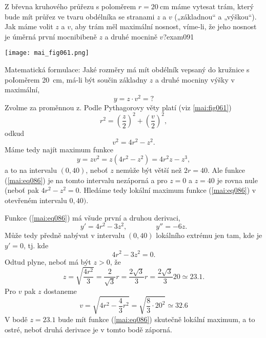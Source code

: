 \begin{mathexam}{Z břevna kruhového průřezu s poloměrem \(r = \SI{20}{\cm}\) máme vytesat trám,
  který bude mít průřez ve tvaru obdélníka se stranami \(z\) a \(v\) („základnou“ a „výškou“). Jak
  máme volit \(z\) a \(v\), aby trám měl maximální nosnost, víme-li, že jeho nosnost je úměrná první
  mocnibibeně \(z\) a druhé mocnině \(v\)?}{exam091}
   
  {\centering
    \captionsetup{type=figure}
    \texttt{[image: mai\_fig061.png]} 
    \label{mai:fig061}
  \par}
  
  Matematická formulace: Jaké rozměry má mít obdélník vepsaný do kružnice s poIoměrem \SI{20}{\cm},
  má-li být součin základny \(z\) a druhé mocniny výšky v maximální,
  \begin{equation*}
    y = z\cdot v^2 = ?
  \end{equation*}
  Zvolme za proměnnou z. Podle Pythagorovy věty platí (viz \ref{mai:fig061})
  \begin{equation*}
      r^2 = \left(\dfrac{z}{2}\right)^2 + \left(\dfrac{v}{2}\right)^2,
  \end{equation*}
  odkud 
  \begin{equation*}
      v^2 = 4r^2 - z^2.
  \end{equation*}
  Máme tedy najít maximum funkce
  \begin{equation}\label{mai:eq086}
      y = zv^2 = z(4r^2 - z^2) = 4r^2z - z^3,
  \end{equation}
  a to na intervalu \((0,40)\), neboť \(z\) nemůže být větší než \(2r = 40\). Ale funkce
  (\ref{mai:eq086}) je na tomto intervalu nezáporná a pro \(z = 0\) a \(z = 40\) je rovna nule
  (neboť pak \(4r^2 - z^2 = 0\). Hledáme tedy lokální maximum funkce (\ref{mai:eq086}) v otevřeném
  intervalu \(0,40)\). 

  Funkce (\ref{mai:eq086}) má všude první a druhou derivaci,
  \begin{equation*}
      y' = 4r^2 - 3z^2, \qquad\qquad y'' = -6z.
  \end{equation*}
  Může tedy předně nabývat v intervalu \((0, 40)\) lokálního extrému jen tam, kde je \(y'=0\), tj.
  kde
  \begin{equation*}
      4r^2 - 3z^2 = 0.
  \end{equation*}
  Odtud plyne, neboť má být \(z > 0\), že
  \begin{equation*}
      z = \sqrt{\dfrac{4r^2}{3}} = \dfrac{2}{\sqrt{3}}r = \dfrac{2\sqrt{3}}{3}r = 
          \dfrac{2\sqrt{3}}{3}20 \simeq \num{23.1}.
  \end{equation*}
  Pro \(v\) pak \(z\) dostaneme
  \begin{equation*}
      v = \sqrt{4r^2 - \dfrac{4}{3}r^2} = \sqrt{\frac{8}{3}\cdot20^2}\simeq\num{32.6}
  \end{equation*}
  V bodě \(z = \num{23.1}\) bude mít funkce (\ref{mai:eq086}) skutečně lokální maximum, a to ostré,
  neboť druhá derivace je v tomto bodě záporná.
\end{mathexam}